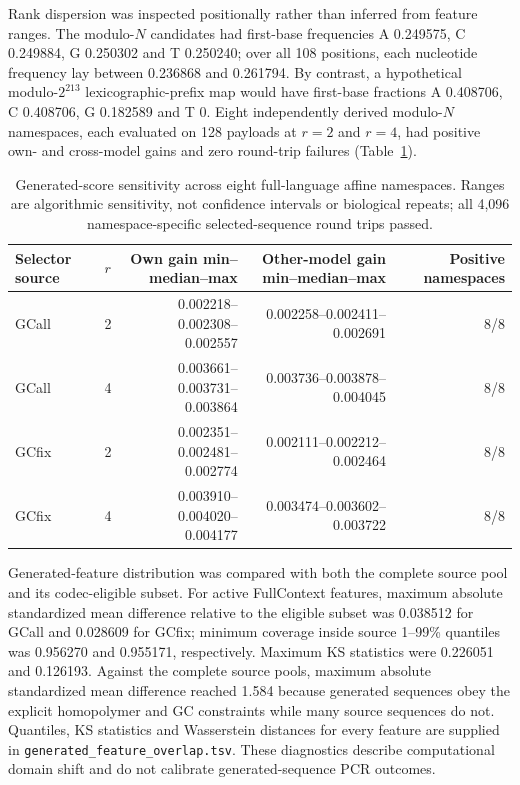 \documentclass[10pt]{article}
\begin{document}
Rank dispersion was inspected positionally rather than inferred from feature ranges. The modulo-$N$ candidates had first-base frequencies A 0.249575, C 0.249884, G 0.250302 and T 0.250240; over all 108 positions, each nucleotide frequency lay between 0.236868 and 0.261794. By contrast, a hypothetical modulo-$2^{213}$ lexicographic-prefix map would have first-base fractions A 0.408706, C 0.408706, G 0.182589 and T 0. Eight independently derived modulo-$N$ namespaces, each evaluated on 128 payloads at $r=2$ and $r=4$, had positive own- and cross-model gains and zero round-trip failures (Table~\ref{tab:s-generated-mappings}).

\begin{table}[H]
\centering
\small
\begin{tabular}{llrrr}
\toprule
Selector source & $r$ & Own gain min--median--max & Other-model gain min--median--max & Positive namespaces \\
\midrule
GCall & 2 & 0.002218--0.002308--0.002557 & 0.002258--0.002411--0.002691 & 8/8 \\
GCall & 4 & 0.003661--0.003731--0.003864 & 0.003736--0.003878--0.004045 & 8/8 \\
GCfix & 2 & 0.002351--0.002481--0.002774 & 0.002111--0.002212--0.002464 & 8/8 \\
GCfix & 4 & 0.003910--0.004020--0.004177 & 0.003474--0.003602--0.003722 & 8/8 \\
\bottomrule
\end{tabular}
\caption{Generated-score sensitivity across eight full-language affine namespaces. Ranges are algorithmic sensitivity, not confidence intervals or biological repeats; all 4,096 namespace-specific selected-sequence round trips passed.}
\label{tab:s-generated-mappings}
\end{table}

Generated-feature distribution was compared with both the complete source pool and its codec-eligible subset. For active FullContext features, maximum absolute standardized mean difference relative to the eligible subset was 0.038512 for GCall and 0.028609 for GCfix; minimum coverage inside source 1--99\% quantiles was 0.956270 and 0.955171, respectively. Maximum KS statistics were 0.226051 and 0.126193. Against the complete source pools, maximum absolute standardized mean difference reached 1.584 because generated sequences obey the explicit homopolymer and GC constraints while many source sequences do not. Quantiles, KS statistics and Wasserstein distances for every feature are supplied in \texttt{generated\_feature\_overlap.tsv}. These diagnostics describe computational domain shift and do not calibrate generated-sequence PCR outcomes.
\end{document}
